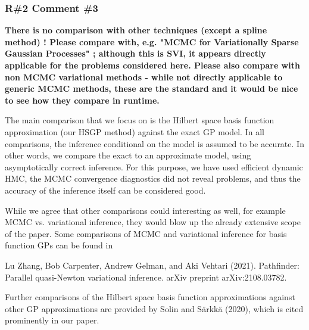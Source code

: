 \documentclass[11pt]{report}
\begin{document}
\subsubsection*{R\#2 Comment \#3}

\textbf{There is no comparison with other techniques (except a spline method) ! Please compare with, e.g. "MCMC for Variationally Sparse Gaussian Processes" ; although this is SVI, it appears directly applicable for the problems considered here. Please also compare with non MCMC variational methods - while not directly applicable to generic MCMC methods, these are the standard and it would be nice to see how they compare in runtime.}

The main comparison that we focus on is the Hilbert space basis function approximation (our HSGP method) against the exact GP model. In all comparisons, the inference conditional on the model is assumed to be accurate. In other words, we compare the exact to an approximate model, using asymptotically correct inference. For this purpose, we have used efficient dynamic HMC, the MCMC convergence diagnostics did not reveal problems, and thus the accuracy of the inference itself can be considered good. 

While we agree that other comparisons could interesting as well, for example MCMC vs. variational inference, they would blow up the already extensive scope of the paper. Some comparisons of MCMC and variational inference for basis function GPs can be found in

Lu Zhang, Bob Carpenter, Andrew Gelman, and Aki Vehtari (2021). Pathfinder: Parallel quasi-Newton variational inference. arXiv preprint arXiv:2108.03782.

Further comparisons of the Hilbert space basis function approximations against other GP approximations are provided by Solin and Särkkä (2020), which is cited prominently in our paper.

\end{document}

